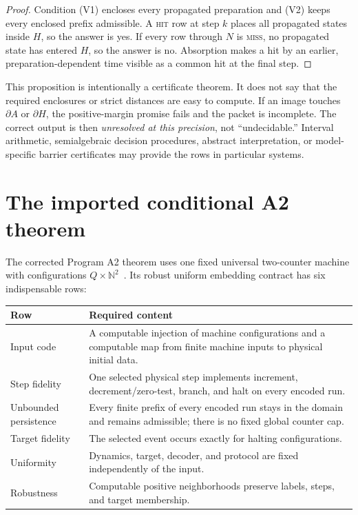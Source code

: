 \documentclass[11pt]{article}
\theoremstyle{definition}
\theoremstyle{remark}
\newcommand{\N}{\mathbb{N}}
\begin{document}
\begin{proof}
Condition (V1) encloses every propagated preparation and (V2) keeps every
enclosed prefix admissible.  A \textsc{hit} row at step \(k\) places all
propagated states inside \(H\), so the answer is yes.  If every row through
\(N\) is \textsc{miss}, no propagated state has entered \(H\), so the answer is
no.  Absorption makes a hit by an earlier, preparation-dependent time visible
as a common hit at the final step.
\end{proof}

This proposition is intentionally a certificate theorem.  It does not say
that the required enclosures or strict distances are easy to compute.  If an
image touches \(\partial A\) or \(\partial H\), the positive-margin promise
fails and the packet is incomplete.  The correct output is then
\emph{unresolved at this precision}, not ``undecidable.''  Interval arithmetic,
semialgebraic decision procedures, abstract interpretation, or model-specific
barrier certificates may provide the rows in particular systems.

\section{The imported conditional A2 theorem}

The corrected Program A2 theorem uses one fixed universal two-counter machine
with configurations \(Q\times\N^2\)~\cite{Minsky1967,NeroA2}.  Its robust
uniform embedding contract has six indispensable rows:
\begin{center}
\begin{tabularx}{0.94\textwidth}{@{}>{\raggedright\arraybackslash}p{}Y@{}}
\toprule
Row & Required content \\
\midrule
Input code & A computable injection of machine configurations and a computable
map from finite machine inputs to physical initial data. \\
Step fidelity & One selected physical step implements increment,
decrement/zero-test, branch, and halt on every encoded run. \\
Unbounded persistence & Every finite prefix of every encoded run stays in the
domain and remains admissible; there is no fixed global counter cap. \\
Target fidelity & The selected event occurs exactly for halting configurations. \\
Uniformity & Dynamics, target, decoder, and protocol are fixed independently of
the input. \\
Robustness & Computable positive neighborhoods preserve labels, steps, and
target membership. \\
\bottomrule
\end{tabularx}
\end{center}
\end{document}
